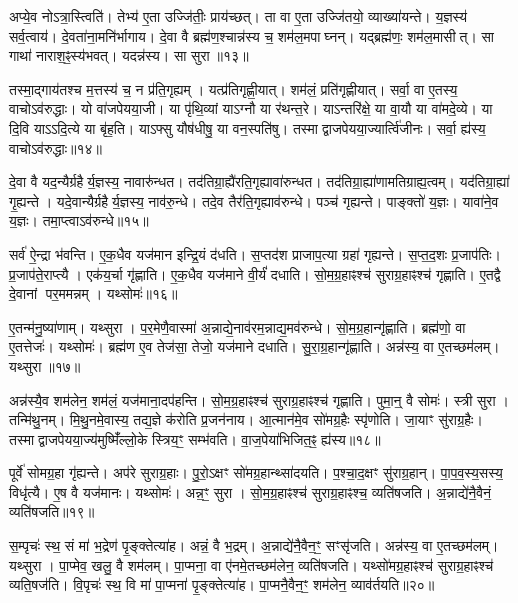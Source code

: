अप्ये॒व नोऽत्रा॒स्त्विति॑।
तेभ्य॑ ए॒ता उज्जि॑तीः॒ प्राय॑च्छत्।
ता वा ए॒ता उज्जि॑तयो॒ व्याख्या॑यन्ते।
य॒ज्ञस्य॑ सर्व॒त्वाय॑।
दे॒वता॑ना॒मनि॑र्भागाय।
दे॒वा वै ब्रह्म॑ण॒श्चान्न॑स्य च॒ शम॑ल॒मपाघ्नन्।
यद्ब्रह्म॑णः॒ शम॑ल॒मासीत्।
सा गाथा॑ नाराश॒ꣴ॒स्य॑भवत्।
यदन्न॑स्य।
सा सुरा॥१३॥

तस्मा॒द्गाय॑तश्च म॒त्तस्य॑ च॒ न प्र॑ति॒गृह्यम्।
यत्प्र॑तिगृह्णी॒यात्।
शम॑लं॒ प्रति॑\-गृह्णीयात्।
सर्वा॒ वा ए॒तस्य॒ वाचो\-ऽव॑रुद्धाः।
यो वा॑जपेयया॒जी।
या पृ॑थि॒व्यां याऽग्नौ या र॑थन्त॒रे।
याऽन्तरि॑क्षे॒ या वा॒यौ या वा॑मदे॒व्ये।
या दि॒वि याऽऽदि॒त्ये या बृ॑ह॒ति।
याऽफ्सु यौष॑धीषु॒ या वन॒स्पति॑षु।
तस्माद्वाजपेयया॒ज्यार्त्वि॑जीनः।
सर्वा॒ ह्य॑स्य॒ वाचो\-ऽव॑रुद्धाः॥१४॥\anuvakamend[धा॒वा॒मेति॒ ज्यैष्ठ्या॑य॒ वेद॑ ब्र॒ह्मा जा॑यते वाज॒पेयः॒ सुरा\-ऽऽर्त्वि॑जीन॒ एकं॑ च]

दे॒वा वै यद॒न्यैर्ग्रहैर्य॒ज्ञस्य॒ नावारु॑न्धत।
तद॑तिग्रा॒ह्यै॑रति॒\-गृह्या\-वा॑रुन्धत।
तद॑तिग्रा॒ह्या॑णामतिग्राह्य॒त्वम्।
यद॑तिग्रा॒ह्या॑ गृ॒ह्यन्ते।
यदे॒वान्यैर्ग्रहैर्य॒ज्ञस्य॒ नाव॑रु॒न्धे।
तदे॒व तैर॑ति॒गृह्या\-व॑रुन्धे।
पञ्च॑ गृह्यन्ते।
पाङ्क्तो॑ य॒ज्ञः।
यावा॑ने॒व य॒ज्ञः।
तमा॒प्त्वा\-ऽव॑रुन्धे॥१५॥

सर्व॑ ऐ॒न्द्रा भ॑वन्ति।
ए॒क॒धैव यज॑मान इन्द्रि॒यं द॑धति।
स॒प्तद॑श प्राजाप॒त्या ग्रहा॑ गृह्यन्ते।
स॒प्त॒द॒शः प्र॒जाप॑तिः।
प्र॒जाप॑ते॒राप्त्यै।
एक॑य॒र्चा गृ॑ह्णाति।
ए॒क॒धैव यज॑माने वी॒र्यं॑ दधाति।
सो॒म॒ग्र॒हाꣴश्च॑ सुराग्र॒हाꣴश्च॑ गृह्णाति।
ए॒तद्वै दे॒वानां पर॒ममन्नम्।
यथ्सोमः॑॥१६॥

ए॒तन्म॑नु॒ष्या॑णाम्।
यथ्सुरा।
प॒र॒मेणै॒वास्मा॑ अ॒न्नाद्ये॒नाव॑र\-म॒न्नाद्य॒मव॑रुन्धे।
सो॒म॒ग्र॒हान्गृ॑ह्णाति।
ब्रह्म॑णो॒ वा ए॒तत्तेजः॑।
यथ्सोमः॑।
ब्रह्म॑ण ए॒व तेज॑सा॒ तेजो॒ यज॑माने दधाति।
सु॒रा॒ग्र॒हान्गृ॑ह्णाति।
अन्न॑स्य॒ वा ए॒तच्छम॑लम्।
यथ्सुरा॥१७॥

अन्न॑स्यै॒व शम॑लेन॒ शम॑लं॒ यज॑माना॒दप॑हन्ति।
सो॒म॒ग्र॒हाꣴश्च॑ सुराग्र॒हाꣴश्च॑ गृह्णाति।
पुमा॒न्॒ वै सोमः॑।
स्त्री सुरा।
तन्मि॑थु॒नम्।
मि॒थु॒नमे॒वास्य॒ तद्य॒ज्ञे क॑रोति प्र॒जन॑नाय।
आ॒त्मान॑मे॒व सो॑मग्र॒हैः स्पृ॑णोति।
जा॒याꣳ सु॑राग्र॒हैः।
तस्माद्वाजपेयया॒ज्य॑मुष्मिँ॑ल्लो॒के स्त्रिय॒ꣳ॒ सम्भ॑वति।
वा॒ज॒पेया॑भिजित॒ꣴ॒ ह्य॑स्य॥१८॥

पूर्वे॑ सोमग्र॒हा गृ॑ह्यन्ते।
अप॑रे सुराग्र॒हाः।
पु॒रो॒\-ऽक्षꣳ सो॑मग्र॒हान्थ्सा॑दयति।
प॒श्चा॒द॒क्षꣳ सु॑राग्र॒हान्।
पा॒प॒व॒स्य॒सस्य॒ विधृ॑त्यै।
ए॒ष वै यज॑मानः।
यथ्सोमः॑।
अन्न॒ꣳ॒ सुरा।
सो॒म॒ग्र॒हाꣴश्च॑ सुराग्र॒हाꣴश्च॒ व्यति॑षजति।
अ॒न्नाद्ये॑नै॒वैनं॒ व्यति॑षजति॥१९॥

स॒म्पृचः॑ स्थ॒ सं मा॑ भ॒द्रेण॑ पृ॒ङ्क्तेत्या॑ह।
अन्नं॒ वै भ॒द्रम्।
अ॒न्नाद्ये॑नै॒वैन॒ꣳ॒ सꣳसृ॑जति।
अन्न॑स्य॒ वा ए॒तच्छम॑लम्।
यथ्सुरा।
पा॒प्मेव॒ खलु॒ वै शम॑लम्।
पा॒प्मना॒ वा ए॑नमे॒तच्छम॑लेन॒ व्यति॑षजति।
यथ्सो॑मग्र॒हाꣴश्च॑ सुराग्र॒हाꣴश्च॑ व्यति॒षज॑ति।
वि॒पृचः॑ स्थ॒ वि मा॑ पा॒प्मना॑ पृ॒ङ्क्तेत्या॑ह।
पा॒प्मनै॒वैन॒ꣳ॒ शम॑लेन॒ व्याव॑र्तयति॥२०॥

